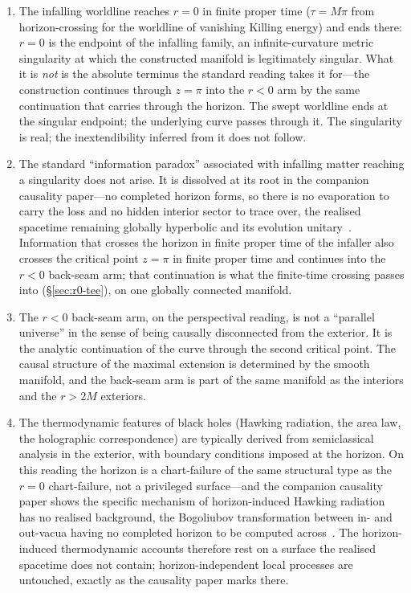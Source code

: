 \documentclass[11pt,a4paper]{article}
\theoremstyle{definition}
\begin{document}
\begin{enumerate}
\item The infalling worldline reaches $r=0$ in finite proper time ($\tau = M\pi$ from horizon-crossing for the worldline of vanishing Killing energy) and ends there: $r=0$ is the endpoint of the infalling family, an infinite-curvature metric singularity at which the constructed manifold is legitimately singular. What it is \emph{not} is the absolute terminus the standard reading takes it for---the construction continues through $z=\pi$ into the $r<0$ arm by the same continuation that carries through the horizon. The swept worldline ends at the singular endpoint; the underlying curve passes through it. The singularity is real; the inextendibility inferred from it does not follow.

\item The standard ``information paradox'' associated with infalling matter reaching a singularity does not arise. It is dissolved at its root in the companion causality paper---no completed horizon forms, so there is no evaporation to carry the loss and no hidden interior sector to trace over, the realised spacetime remaining globally hyperbolic and its evolution unitary~\cite{JanzenBHcausality}. Information that crosses the horizon in finite proper time of the infaller also crosses the critical point $z=\pi$ in finite proper time and continues into the $r<0$ back-seam arm; that continuation is what the finite-time crossing passes into (\S\ref{sec:r0-tee}), on one globally connected manifold.

\item The $r<0$ back-seam arm, on the perspectival reading, is not a ``parallel universe'' in the sense of being causally disconnected from the exterior. It is the analytic continuation of the curve through the second critical point. The causal structure of the maximal extension is determined by the smooth manifold, and the back-seam arm is part of the same manifold as the interiors and the $r>2M$ exteriors.

\item The thermodynamic features of black holes (Hawking radiation, the area law, the holographic correspondence) are typically derived from semiclassical analysis in the exterior, with boundary conditions imposed at the horizon. On this reading the horizon is a chart-failure of the same structural type as the $r=0$ chart-failure, not a privileged surface---and the companion causality paper shows the specific mechanism of horizon-induced Hawking radiation has no realised background, the Bogoliubov transformation between in- and out-vacua having no completed horizon to be computed across~\cite{JanzenBHcausality}. The horizon-induced thermodynamic accounts therefore rest on a surface the realised spacetime does not contain; horizon-independent local processes are untouched, exactly as the causality paper marks there.
\end{enumerate}
\end{document}
